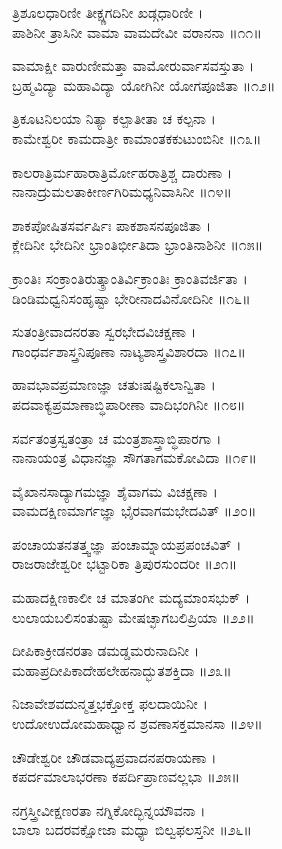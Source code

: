 ತ್ರಿಶೂಲಧಾರಿಣೀ ತೀಕ್ಷ್ಣಗದಿನೀ ಖಡ್ಗಧಾರಿಣೀ ।\\
ಪಾಶಿನೀ ತ್ರಾಸಿನೀ ವಾಮಾ ವಾಮದೇವೀ ವರಾನನಾ ॥೧೧॥

ವಾಮಾಕ್ಷೀ ವಾರುಣೀಮತ್ತಾ ವಾಮೋರುರ್ವಾಸವಸ್ತುತಾ ।\\
ಬ್ರಹ್ಮವಿದ್ಯಾ ಮಹಾವಿದ್ಯಾ ಯೋಗಿನೀ ಯೋಗಪೂಜಿತಾ ॥೧೨॥

ತ್ರಿಕೂಟನಿಲಯಾ ನಿತ್ಯಾ ಕಲ್ಪಾತೀತಾ ಚ ಕಲ್ಪನಾ ।\\
ಕಾಮೇಶ್ವರೀ ಕಾಮದಾತ್ರೀ ಕಾಮಾಂತಕಕುಟುಂಬಿನೀ ॥೧೩॥

ಕಾಲರಾತ್ರಿರ್ಮಹಾರಾತ್ರಿರ್ಮೋಹರಾತ್ರಿಶ್ಚ ದಾರುಣಾ ।\\
ನಾನಾದ್ರುಮಲತಾಕೀರ್ಣಗಿರಿಮಧ್ಯನಿವಾಸಿನೀ ॥೧೪॥

ಶಾಕಪೋಷಿತಸರ್ವರ್ಷಿಃ ಪಾಕಶಾಸನಪೂಜಿತಾ ।\\
ಕ್ಲೇದಿನೀ ಭೇದಿನೀ ಭ್ರಾಂತಿರ್ಭೀತಿದಾ ಭ್ರಾಂತಿನಾಶಿನೀ ॥೧೫॥

ಕ್ರಾಂತಿಃ ಸಂಕ್ರಾಂತಿರುತ್ಕ್ರಾಂತಿರ್ವಿಕ್ರಾಂತಿಃ ಕ್ರಾಂತಿವರ್ಜಿತಾ ।\\
ಡಿಂಡಿಮಧ್ವನಿಸಂಹೃಷ್ಟಾ ಭೇರೀನಾದವಿನೋದಿನೀ ॥೧೬॥

ಸುತಂತ್ರೀವಾದನರತಾ ಸ್ವರಭೇದವಿಚಕ್ಷಣಾ ।\\
ಗಾಂಧರ್ವಶಾಸ್ತ್ರನಿಪೂಣಾ ನಾಟ್ಯಶಾಸ್ತ್ರವಿಶಾರದಾ ॥೧೭॥

ಹಾವಭಾವಪ್ರಮಾಣಜ್ಞಾ ಚತುಃಷಷ್ಟಿಕಲಾನ್ವಿತಾ ।\\
ಪದವಾಕ್ಯಪ್ರಮಾಣಾಬ್ಧಿಪಾರೀಣಾ ವಾದಿಭಂಗಿನೀ ॥೧೮॥

ಸರ್ವತಂತ್ರಸ್ವತಂತ್ರಾ ಚ ಮಂತ್ರಶಾಸ್ತ್ರಾಬ್ಧಿಪಾರಗಾ ।\\
ನಾನಾಯಂತ್ರ ವಿಧಾನಜ್ಞಾ ಸೌಗತಾಗಮಕೋವಿದಾ ॥೧೯॥

ವೈಖಾನಸಾದ್ಯಾಗಮಜ್ಞಾ ಶೈವಾಗಮ ವಿಚಕ್ಷಣಾ ।\\
ವಾಮದಕ್ಷಿಣಮಾರ್ಗಜ್ಞಾ ಭೈರವಾಗಮಭೇದವಿತ್ ॥೨೦॥

ಪಂಚಾಯತನತತ್ತ್ವಜ್ಞಾ ಪಂಚಾಮ್ನಾಯಪ್ರಪಂಚವಿತ್ ।\\
ರಾಜರಾಜೇಶ್ವರೀ ಭಟ್ಟಾರಿಕಾ ತ್ರಿಪುರಸುಂದರೀ ॥೨೧॥

ಮಹಾದಕ್ಷಿಣಕಾಲೀ ಚ ಮಾತಂಗೀ ಮದ್ಯಮಾಂಸಭುಕ್ ।\\
ಲುಲಾಯಬಲಿಸಂತುಷ್ಟಾ ಮೇಷಚ್ಛಾಗಬಲಿಪ್ರಿಯಾ ॥೨೨॥

ದೀಪಿಕಾಕ್ರೀಡನರತಾ ಡಮಡ್ಡಮರುನಾದಿನೀ ।\\
ಮಹಾಪ್ರದೀಪಿಕಾದೇಹಲೇಹನಾದ್ಭುತಶಕ್ತಿದಾ ॥೨೩॥

ನಿಜಾವೇಶವದುನ್ಮತ್ತಭಕ್ತೋಕ್ತ ಫಲದಾಯಿನೀ ।\\
ಉದೋಉದೋಮಹಾಧ್ವಾನ ಶ್ರವಣಾಸಕ್ತಮಾನಸಾ ॥೨೪॥

ಚೌಡೇಶ್ವರೀ ಚೌಡವಾದ್ಯಪ್ರವಾದನಪರಾಯಣಾ ।\\
ಕಪರ್ದಮಾಲಾಭರಣಾ ಕಪರ್ದಿಪ್ರಾಣವಲ್ಲಭಾ ॥೨೫॥

ನಗ್ರಸ್ತ್ರೀವೀಕ್ಷಣರತಾ ನಗ್ನಿಕೋದ್ಭಿನ್ನಯೌವನಾ ।\\
ಬಾಲಾ ಬದರವಕ್ಷೋಜಾ ಮಧ್ಯಾ ಬಿಲ್ವಫಲಸ್ತನೀ ॥೨೬॥

